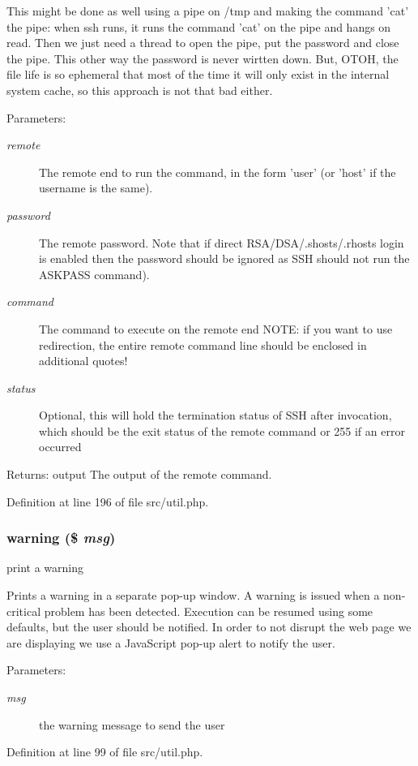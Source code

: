 This might be done as well using a pipe on /tmp and making the command 'cat' the pipe: when ssh runs, it runs the command 'cat' on the pipe and hangs on read. Then we just need a thread to open the pipe, put the password and close the pipe. This other way the password is never wirtten down. But, OTOH, the file life is so ephemeral that most of the time it will only exist in the internal system cache, so this approach is not that bad either.

\begin{Desc}
\item[Parameters:]
\begin{description}
\item[{\em remote}]The remote end to run the command, in the form 'user' (or 'host' if the username is the same). \item[{\em password}]The remote password. Note that if direct RSA/DSA/.shosts/.rhosts login is enabled then the password should be ignored as SSH should not run the ASKPASS command). \item[{\em command}]The command to execute on the remote end NOTE: if you want to use redirection, the entire remote command line should be enclosed in additional quotes! \item[{\em status}]Optional, this will hold the termination status of SSH after invocation, which should be the exit status of the remote command or 255 if an error occurred \end{description}
\end{Desc}
\begin{Desc}
\item[Returns:]output The output of the remote command. \end{Desc}


Definition at line 196 of file src/util.php.
\subsubsection{\setlength{\rightskip}{0pt plus 5cm}warning (\$ {\em msg})}\label{src_2util_8php_a2}


print a warning 

Prints a warning in a separate pop-up window. A warning is issued when a non-critical problem has been detected. Execution can be resumed using some defaults, but the user should be notified. In order to not disrupt the web page we are displaying we use a Java\-Script pop-up alert to notify the user.

\begin{Desc}
\item[Parameters:]
\begin{description}
\item[{\em msg}]the warning message to send the user \end{description}
\end{Desc}


Definition at line 99 of file src/util.php.